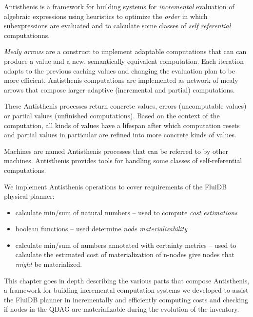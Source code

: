 

\begin{summary}
\item Antisthenis is a framework for building systems for
  \emph{incremental} evaluation of algebraic expressions using
  heuristics to optimize the \emph{order} in which subexpressions are
  evaluated and to calculate some classes of \emph{self referential}
  computationns.
\item \emph{Mealy arrows} are a construct to implement adaptable
  computations that can can produce a value and a new, semantically
  equivalent computation. Each iteration adapts to the previous
  caching values and changing the evaluation plan to be more
  efficient. Antisthenis computations are implemented as network of
  mealy arrows that compose larger adaptive (incremental and partial)
  computations.
\item These Antisthenis processes return concrete values, errors
  (uncomputable values) or partial values (unfinished
  computations). Based on the context of the computation, all kinds of
  values have a lifespan after which computation resets and partial
  values in particular are refined into more concrete kinds of values.
\item Machines are named Antisthenis processes that can be referred to
  by other machines. Antisthenis provides tools for handling some
  classes of self-referential computations.
\item We implement Antisthenis operations to cover requirements of the
  FluiDB physical planner:

  \begin{itemize}
  \item calculate min/sum of natural numbers -- used to compute
    \emph{cost estimations}
  \item boolean functions -- used determine \emph{node materializability}
  \item calculate min/sum of numbers annotated with certainty metrics
    -- used to calculate the estimated cost of materialization of
   n-nodes give nodes that \emph{might} be materialized.
  \end{itemize}
\end{summary}

This chapter goes in depth describing the various parts that compose
Antisthenis, a framework for building incremental computation systems
we developed to assist the FluiDB planner in incrementally and
efficiently computing costs and checking if nodes in the QDAG are
materializable during the evolution of the inventory.

